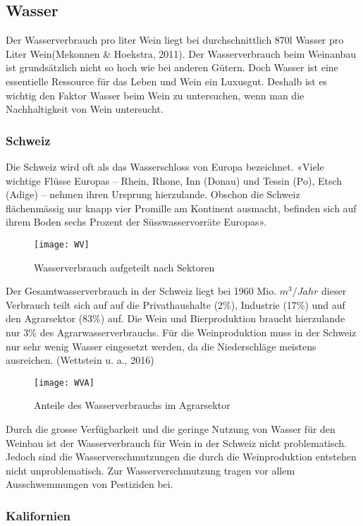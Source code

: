 \subsection{Wasser}
Der Wasserverbrauch pro liter Wein liegt bei durchschnittlich 870l Wasser pro Liter Wein(Mekonnen \& Hoekstra, 2011). Der Wasserverbrauch beim Weinanbau ist grundsätzlich nicht so hoch wie bei anderen Gütern. Doch Wasser ist eine essentielle Ressource für das Leben und Wein ein Luxusgut. Deshalb ist es wichtig den Faktor Wasser beim Wein zu untersuchen, wenn man die Nachhaltigkeit von Wein untersucht.
\subsubsection{Schweiz}
Die Schweiz wird oft als das Wasserschloss von Europa bezeichnet. «Viele wichtige Flüsse Europas – Rhein, Rhone, Inn (Donau) und Tessin (Po), Etsch (Adige) – nehmen ihren Ursprung hierzulande. Obschon die Schweiz flächenmässig nur knapp vier Promille am Kontinent ausmacht, befinden sich auf ihrem Boden sechs Prozent der Süsswasservorräte Europas».\cite{_weil}
\begin{figure}[H]
	\centering
	\texttt{[image: WV]}
	\caption{Wasserverbrauch aufgeteilt nach Sektoren}
\end{figure}
Der Gesamtwasserverbrauch in der Schweiz liegt bei 1960 Mio. $m^3/Jahr$ dieser Verbrauch teilt sich auf auf die Privathaushalte (2\%), Industrie (17\%) und auf den Agrarsektor (83\%) auf. Die Wein und Bierproduktion braucht hierzulande nur 3\% des Agrarwasserverbrauchs. Für die Weinproduktion muss in der Schweiz nur sehr wenig Wasser eingesetzt werden, da die Niederschläge meistens ausreichen. (Wettstein u. a., 2016)
\begin{figure}[H]
	\centering
	\texttt{[image: WVA]}
	\caption{Anteile des Wasserverbrauchs im       Agrarsektor}
\end{figure}

Durch die grosse Verfügbarkeit und die geringe Nutzung von Wasser für den Weinbau ist der Wasserverbrauch für Wein in der Schweiz nicht problematisch. Jedoch sind die Wasserverschmutzungen die durch die Weinproduktion entstehen nicht unproblematisch. Zur Wasserverschmutzung tragen vor allem Ausschwemmungen von Pestiziden bei.

\subsubsection{Kalifornien}
\label{sub:wasserverbrauch}

